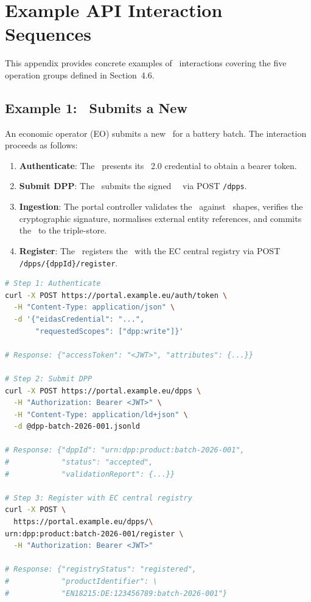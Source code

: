 \section{Example API Interaction Sequences}
\label{app:api-examples}

This appendix provides concrete examples of \API\ interactions covering the five
operation groups defined in Section~4.6.

\subsection{Example 1: \REO\ Submits a New \DPP}

An economic operator (EO) submits a new \DPP\ for a battery batch. The
interaction proceeds as follows:

\begin{enumerate}
\item \textbf{Authenticate}: The \EO\ presents its \eIDAS~2.0 credential to
obtain a bearer token.
\item \textbf{Submit DPP}: The \EO\ submits the signed \JSONLD\ \DPP\ via POST
\texttt{/dpps}.
\item \textbf{Ingestion}: The portal controller validates the \DPP\ against
\SHACL\ shapes, verifies the cryptographic signature, normalises external entity
references, and commits the \DPP\ to the triple-store.
\item \textbf{Register}: The \EO\ registers the \DPP\ with the EC central
registry via POST \texttt{/dpps/\{dppId\}/register}.
\end{enumerate}

\begin{lstlisting}[language=bash,breaklines=true,breakatwhitespace=true]
# Step 1: Authenticate
curl -X POST https://portal.example.eu/auth/token \
  -H "Content-Type: application/json" \
  -d '{"eidasCredential": "...",
       "requestedScopes": ["dpp:write"]}'

# Response: {"accessToken": "<JWT>", "attributes": {...}}

# Step 2: Submit DPP
curl -X POST https://portal.example.eu/dpps \
  -H "Authorization: Bearer <JWT>" \
  -H "Content-Type: application/ld+json" \
  -d @dpp-batch-2026-001.jsonld

# Response: {"dppId": "urn:dpp:product:batch-2026-001",
#            "status": "accepted",
#            "validationReport": {...}}

# Step 3: Register with EC central registry
curl -X POST \
  https://portal.example.eu/dpps/\
urn:dpp:product:batch-2026-001/register \
  -H "Authorization: Bearer <JWT>"

# Response: {"registryStatus": "registered",
#            "productIdentifier": \
#            "EN18215:DE:123456789:batch-2026-001"}
\end{lstlisting}

